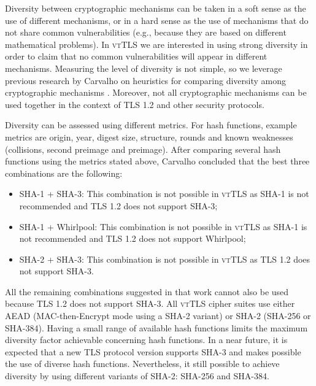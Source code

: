 \documentclass{sig-alternate-05-2015}
\begin{document}
Diversity between cryptographic mechanisms can be taken in a soft sense as the use of different mechanisms, or in a hard sense as the use of mechanisms that do not share common vulnerabilities (e.g., because they are based on different mathematical problems). In \textsc{vtTLS} we are interested in using strong diversity in order to claim that no common vulnerabilities will appear in different mechanisms. Measuring the level of diversity is not simple, so we leverage previous research by Carvalho on heuristics for comparing diversity among  cryptographic mechanisms \cite{CarvalhoThesis14}. Moreover, not all cryptographic mechanisms can be used together in the context of TLS 1.2 and other security protocols. 

Diversity can be assessed using different metrics. For hash functions, example metrics are origin, year, digest size, structure, rounds and known weaknesses (collisions, second preimage and preimage).
After comparing several hash functions using the metrics stated above, Carvalho concluded that the best three combinations are the following:
\begin{itemize}
\item {SHA-1 + SHA-3: This combination is not possible in \textsc{vtTLS} as SHA-1 is not recommended and TLS 1.2 does not support SHA-3;}
\item {SHA-1 + Whirlpool: This combination is not possible in \textsc{vtTLS} as SHA-1 is not recommended and TLS 1.2 does not support Whirlpool;} 
\item {SHA-2 + SHA-3: This combination is not possible in \textsc{vtTLS} as TLS 1.2 does not support SHA-3.}
\end{itemize}

All the remaining  combinations suggested in that work cannot also be used because TLS 1.2 does not support SHA-3.
All \textsc{vtTLS} cipher suites use either AEAD (MAC-then-Encrypt mode using a SHA-2 variant) or SHA-2 (SHA-256 or SHA-384).
Having a small range of available hash functions limits the maximum diversity factor achievable concerning hash functions.
In a near future, it is expected that a new TLS protocol version supports SHA-3 and makes possible the use of diverse hash functions.
Nevertheless, it still possible to achieve diversity by using different variants of SHA-2: SHA-256 and SHA-384.
\end{document}
